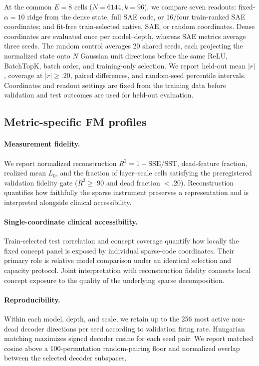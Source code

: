 At the common $E=8$ cells ($N=6144,k=96$), we compare seven readouts: fixed-$\alpha=10$ ridge from the dense state, full SAE code, or 16/four train-ranked SAE coordinates; and fit-free train-selected native, SAE, or random coordinates. Dense coordinates are evaluated once per model--depth, whereas SAE metrics average three seeds. The random control averages 20 shared seeds, each projecting the normalized state onto $N$ Gaussian unit directions before the same ReLU, BatchTopK, batch order, and training-only selection. We report held-out mean $|r|$, coverage at $|r|\geq.20$, paired differences, and random-seed percentile intervals. Coordinates and readout settings are fixed from the training data before validation and test outcomes are used for held-out evaluation.

\subsection{Metric-specific FM profiles}

\paragraph{Measurement fidelity.}
We report normalized reconstruction $R^2=1-\mathrm{SSE}/\mathrm{SST}$, dead-feature fraction, realized mean $L_0$, and the fraction of layer--scale cells satisfying the preregistered validation fidelity gate ($R^2\geq.90$ and dead fraction $<.20$). Reconstruction quantifies how faithfully the sparse instrument preserves a representation and is interpreted alongside clinical accessibility.

\paragraph{Single-coordinate clinical accessibility.}
Train-selected test correlation and concept coverage quantify how locally the fixed concept panel is exposed by individual sparse-code coordinates. Their primary role is relative model comparison under an identical selection and capacity protocol. Joint interpretation with reconstruction fidelity connects local concept exposure to the quality of the underlying sparse decomposition.

\paragraph{Reproducibility.}
Within each model, depth, and scale, we retain up to the 256 most active non-dead decoder directions per seed according to validation firing rate. Hungarian matching maximizes signed decoder cosine for each seed pair. We report matched cosine above a 100-permutation random-pairing floor and normalized overlap between the selected decoder subspaces.

